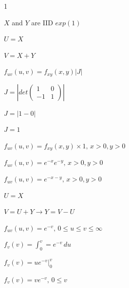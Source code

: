 \documentclass[12 pt]{article}
\begin{document}
    \begin{exercise}{1}
    \hfill

    $X$ and $Y$ are IID $exp(1)$

    $U=X$

    $V=X+Y$

    \hfill

    $f_{uv}(u,v) = f_{xy}(x,y) |J|$

    $ J = | det\begin{pmatrix}
        1 & 0 \\
        -1 & 1
    \end{pmatrix} |$

    $J = |1 - 0|$

    $J = 1$

    \hfill

    $f_{uv}(u,v) = f_{xy}(x,y) \times 1, \, x >0, y> 0$

    $f_{uv}(u,v) = e^{-x}e^{-y}, \, x >0, y> 0$

    $f_{uv}(u,v) = e^{-x-y}, \, x >0, y> 0$

    \hfill

    $U=X$

    $V=U+Y \xrightarrow{} Y= V-U$

    \hfill

    $f_{uv}(u,v) = e^{-v}, \, 0 \leq u \leq v \leq \infty$

    \hfill

    $f_v(v) = \int_{0}^{v} = e^{-v} \, du$

    $f_v(v) = ue^{-v} |_{0}^{v}$

    $f_v(v) = ve^{-v}, \, 0 \leq v$

    \hfill
    \end{exercise}
\end{document}
